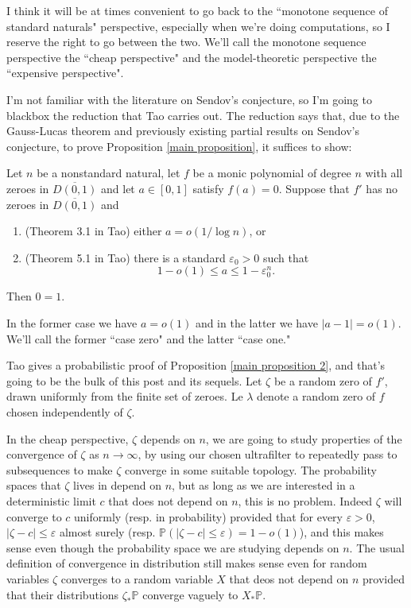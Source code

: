 \documentclass[12pt]{article}
\newcommand{\PP}{\mathbb P}
\begin{document}
I think it will be at times convenient to go back to the ``monotone sequence of standard naturals" perspective, especially when we're doing computations, so I reserve the right to go between the two.
We'll call the monotone sequence perspective the ``cheap perspective" and the model-theoretic perspective the ``expensive perspective".

I'm not familiar with the literature on Sendov's conjecture, so I'm going to blackbox the reduction that Tao carries out.
The reduction says that, due to the Gauss-Lucas theorem and previously existing partial results on Sendov's conjecture, to prove Proposition \ref{main proposition}, it suffices to show:

\begin{proposition}
\label{main proposition 2}
Let $n$ be a nonstandard natural, let $f$ be a monic polynomial of degree $n$ with all zeroes in $\overline{D(0, 1)}$ and let $a \in [0, 1]$ satisfy $f(a) = 0$.
Suppose that $f'$ has no zeroes in $\overline{D(0, 1)}$ and
\begin{enumerate}
\item (Theorem 3.1 in Tao) either $a = o(1/\log n)$, or
\item (Theorem 5.1 in Tao) there is a standard $\varepsilon_0 > 0$ such that
$$1 - o(1) \leq a \leq 1 - \varepsilon_0^n.$$
\end{enumerate}
Then $0 = 1$.
\end{proposition}

In the former case we have $a = o(1)$ and in the latter we have $|a - 1| = o(1)$.
We'll call the former ``case zero" and the latter ``case one."

Tao gives a probabilistic proof of Proposition \ref{main proposition 2}, and that's going to be the bulk of this post and its sequels.
Let $\zeta$ be a random zero of $f'$, drawn uniformly from the finite set of zeroes.
Le $\lambda$ denote a random zero of $f$ chosen independently of $\zeta$.

In the cheap perspective, $\zeta$ depends on $n$, we are going to study properties of the convergence of $\zeta$ as $n \to \infty$, by using our chosen ultrafilter to repeatedly pass to subsequences to make $\zeta$ converge in some suitable topology.
The probability spaces that $\zeta$ lives in depend on $n$, but as long as we are interested in a deterministic limit $c$ that does not depend on $n$, this is no problem.
Indeed $\zeta$ will converge to $c$ uniformly (resp. in probability) provided that for every $\varepsilon > 0$, $|\zeta - c| \leq \varepsilon$ almost surely (resp. $\PP(|\zeta - c| \leq \varepsilon) = 1 - o(1)$), and this makes sense even though the probability space we are studying depends on $n$.
The usual definition of convergence in distribution still makes sense even for random variables $\zeta$ converges to a random variable $X$ that deos not depend on $n$ provided that their distributions $\zeta_*\PP$ converge vaguely to $X_*\PP$.
\end{document}
